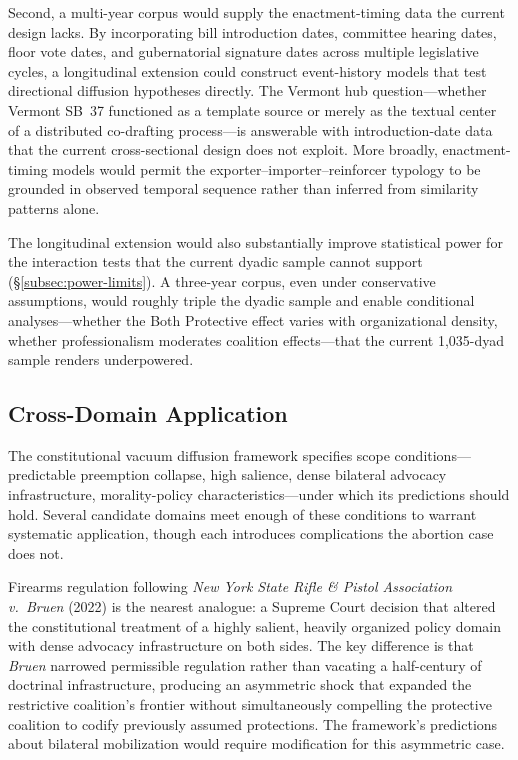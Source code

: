 Second, a multi-year corpus would supply the enactment-timing data the current design lacks. By incorporating bill introduction dates, committee hearing dates, floor vote dates, and gubernatorial signature dates across multiple legislative cycles, a longitudinal extension could construct event-history models that test directional diffusion hypotheses directly. The Vermont hub question---whether Vermont SB~37 functioned as a template source or merely as the textual center of a distributed co-drafting process---is answerable with introduction-date data that the current cross-sectional design does not exploit. More broadly, enactment-timing models would permit the exporter--importer--reinforcer typology to be grounded in observed temporal sequence rather than inferred from similarity patterns alone.

The longitudinal extension would also substantially improve statistical power for the interaction tests that the current dyadic sample cannot support (\S\ref{subsec:power-limits}). A three-year corpus, even under conservative assumptions, would roughly triple the dyadic sample and enable conditional analyses---whether the Both Protective effect varies with organizational density, whether professionalism moderates coalition effects---that the current 1{,}035-dyad sample renders underpowered.

\subsection{Cross-Domain Application}
\label{subsec:future-cross-domain}

The constitutional vacuum diffusion framework specifies scope conditions---predictable preemption collapse, high salience, dense bilateral advocacy infrastructure, morality-policy characteristics---under which its predictions should hold. Several candidate domains meet enough of these conditions to warrant systematic application, though each introduces complications the abortion case does not.

Firearms regulation following \emph{New York State Rifle \& Pistol Association v.\ Bruen} (2022) is the nearest analogue: a Supreme Court decision that altered the constitutional treatment of a highly salient, heavily organized policy domain with dense advocacy infrastructure on both sides. The key difference is that \emph{Bruen} narrowed permissible regulation rather than vacating a half-century of doctrinal infrastructure, producing an asymmetric shock that expanded the restrictive coalition's frontier without simultaneously compelling the protective coalition to codify previously assumed protections. The framework's predictions about bilateral mobilization would require modification for this asymmetric case.

